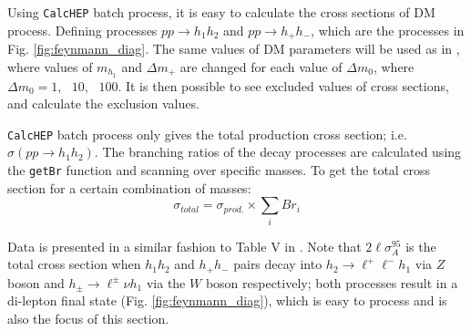 \documentclass[12pt]{article}
\begin{document}
Using \verb|CalcHEP| batch process, it is easy to calculate the cross sections of DM process. Defining processes $pp\rightarrow h_1h_2$ and $pp \rightarrow h_+h_-$, which are the processes in Fig. \ref{fig:feynmann_diag}. The same values of DM parameters will be used as in \cite{Belyaev_2022}, where values of $m_{h_1}$ and $\Delta m_+$ are changed for each value of $\Delta m_0$, where $\Delta m_0 = 1, \text{ }10,\text{ } 100$. It is then possible to see excluded values of cross sections, and calculate the exclusion values.

\verb|CalcHEP| batch process only gives the total production cross section; i.e. $\sigma(pp\rightarrow h_1 h_2)$. The branching ratios of the decay processes are calculated using the \verb|getBr| function and scanning over specific masses. To get the total cross section for a certain combination of masses:
\begin{equation}
    \sigma_{total} = \sigma_{prod.} \times \sum_i Br_i
\end{equation}

Data is presented in a similar fashion to Table V in \cite{Belyaev_2022}. Note that $2 \ell \sigma_{A}^{95}$ is the total cross section when $h_1 h_2$ and $h_+h_-$ pairs decay into $h_2 \rightarrow \ell^+\ell^-h_1$ via $Z$ boson and $h_\pm \rightarrow \ell^\pm \nu h_1$ via the $W$ boson respectively; both processes result in a di-lepton final state (Fig. \ref{fig:feynmann_diag}), which is easy to process and is also the focus of this section.
\end{document}
